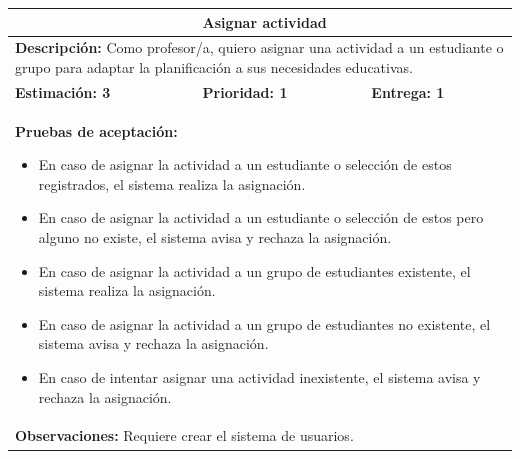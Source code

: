 \begin{table}[H]
\centering
{}
\begin{tabularx}{\textwidth}{|X|X|X|}
\hline
\rowcolor{azulclaro}
\multicolumn{1}{|l|}{\textbf{Identificador:} HU-P6} & \multicolumn{2}{l|}{\textbf{Asignar actividad}} \\ \hline
\multicolumn{3}{|p{\dimexpr\textwidth-2\tabcolsep-2\arrayrulewidth}|}{\textbf{Descripción:} Como profesor/a, quiero asignar una actividad a un estudiante o grupo para adaptar la planificación a sus necesidades educativas.~} \\ \hline
\rowcolor{white}
\textbf{Estimación: 3} & \textbf{Prioridad: 1} & \textbf{Entrega: 1} \\ \hline
\multicolumn{3}{|p{\dimexpr\textwidth-2\tabcolsep-2\arrayrulewidth}|}{%
\textbf{Pruebas de aceptación:}
\begin{itemize}[leftmargin=1.5em, itemsep=2pt, topsep=3pt]
    \item En caso de asignar la actividad a un estudiante o selección de estos registrados, el sistema realiza la asignación.
    \item En caso de asignar la actividad a un estudiante o selección de estos pero alguno no existe, el sistema avisa y rechaza la asignación.
    \item En caso de asignar la actividad a un grupo de estudiantes existente, el sistema realiza la asignación.
    \item En caso de asignar la actividad a un grupo de estudiantes no existente, el sistema avisa y rechaza la asignación.
    \item En caso de intentar asignar una actividad inexistente, el sistema avisa y rechaza la asignación.
\end{itemize}
} \\ \hline
\multicolumn{3}{|p{\dimexpr\textwidth-2\tabcolsep-2\arrayrulewidth}|}{\textbf{Observaciones:} Requiere crear el sistema de usuarios.} \\ \hline
\end{tabularx}
\end{table}

\vspace{0.4cm}

